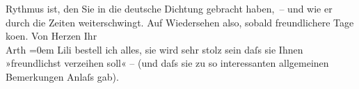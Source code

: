 \begin{ledgroupsized}[t]{13cm}
                    Rythmus ist, den Sie in die deutsche Dichtung gebracht haben, – und wie er durch
                    die Zeiten weiterschwingt.\pend
           \pstart
           Auf Wiedersehen also, sobald freundlichere Tage ko{\geminationm}en.\pend
           \pstart
           Von Herzen Ihr{\\[\baselineskip]}\spacefill\mbox{Arth}\pend
           \leftskip=0em{}\pstart
           \noindent{}Lili bestell ich alles, sie wird sehr
                        stolz sein daſs sie Ihnen »freundlichst verzeihen soll« – (und daſs sie zu
                        so interessanten allgemeinen Bemerkungen Anlaſs gab).\pend
           
         
         \endnumbering{}\end{ledgroupsized}  \newcommand{\dateiname}{L02467}\newcommand{\titel}{Arthur Schnitzler an Hugo Hofmannsthal, 11. 3. 1926}\newcommand{\editorInnen}{Martin Anton Müller und Gerd-Hermann Susen}
      